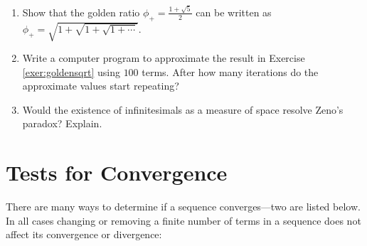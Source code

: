 {\begin{enumerate}[\bfseries 1.]
\begin{enumerate}[\bfseries (a)]
 $x^2-x-1=0$) can be written as
\[
\phi_{+} ~=~ 1 ~+~ \cfrac{1}{1 \;+\; \cfrac{1}{1 \;+\; \cfrac{1}{1 \;+\; \cdots}}} ~.
\]
\emph{(Hint: Look for a recurrence relation in the fraction.)}
 \item Show that
\[
\sqrt{2} ~=~ 1 ~+~ \cfrac{1}{2 \;+\; \cfrac{1}{2 \;+\; \cfrac{1}{2 \;+\; \cdots}}} ~.
\]
\end{enumerate}
 \item\label{exer:goldensqrt} Show that the golden ratio
  $\phi_{+} = \frac{1+\sqrt{5}}{2}$ can be written as
  $\phi_{+} = \sqrt{1 + \sqrt{1 + \sqrt{1 + \cdots}}}$.
 \item Write a computer program to approximate the result in Exercise
  \ref{exer:goldensqrt} using $100$ terms. After how many iterations do the
   approximate values start repeating?
 \item Would the existence of infinitesimals as a measure of space resolve
  Zeno's paradox? Explain.
\end{enumerate}
}
\newpage
\section{Tests for Convergence}
There are many ways to determine if a sequence converges---two are
listed below. In all cases changing or removing a finite number of terms in a
sequence does not affect its convergence or divergence:


